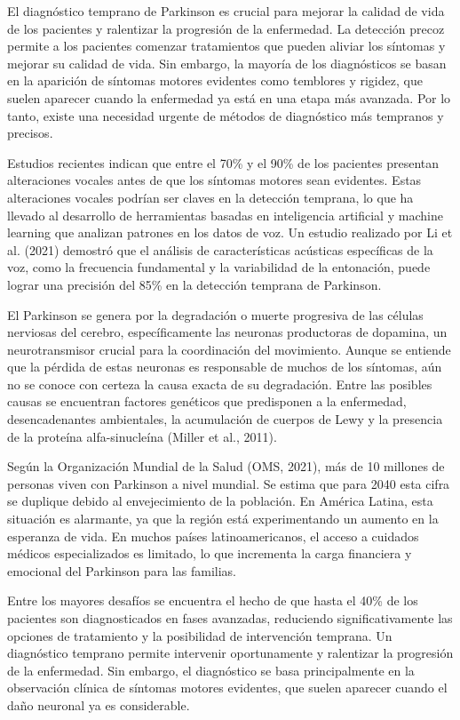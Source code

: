 \documentclass[a4paper,12pt]{article}
\begin{document}
El diagnóstico temprano de Parkinson es crucial para mejorar la calidad de vida de los pacientes y ralentizar la progresión de la enfermedad. La detección precoz permite a los pacientes comenzar tratamientos que pueden aliviar los síntomas y mejorar su calidad de vida. Sin embargo, la mayoría de los diagnósticos se basan en la aparición de síntomas motores evidentes como temblores y rigidez, que suelen aparecer cuando la enfermedad ya está en una etapa más avanzada. Por lo tanto, existe una necesidad urgente de métodos de diagnóstico más tempranos y precisos.

Estudios recientes indican que entre el 70\% y el 90\% de los pacientes presentan alteraciones vocales antes de que los síntomas motores sean evidentes. Estas alteraciones vocales podrían ser claves en la detección temprana, lo que ha llevado al desarrollo de herramientas basadas en inteligencia artificial y machine learning que analizan patrones en los datos de voz. Un estudio realizado por Li et al. (2021) demostró que el análisis de características acústicas específicas de la voz, como la frecuencia fundamental y la variabilidad de la entonación, puede lograr una precisión del 85\% en la detección temprana de Parkinson.

El Parkinson se genera por la degradación o muerte progresiva de las células nerviosas del cerebro, específicamente las neuronas productoras de dopamina, un neurotransmisor crucial para la coordinación del movimiento. Aunque se entiende que la pérdida de estas neuronas es responsable de muchos de los síntomas, aún no se conoce con certeza la causa exacta de su degradación. Entre las posibles causas se encuentran factores genéticos que predisponen a la enfermedad, desencadenantes ambientales, la acumulación de cuerpos de Lewy y la presencia de la proteína alfa-sinucleína (Miller et al., 2011).

Según la Organización Mundial de la Salud (OMS, 2021), más de 10 millones de personas viven con Parkinson a nivel mundial. Se estima que para 2040 esta cifra se duplique debido al envejecimiento de la población. En América Latina, esta situación es alarmante, ya que la región está experimentando un aumento en la esperanza de vida. En muchos países latinoamericanos, el acceso a cuidados médicos especializados es limitado, lo que incrementa la carga financiera y emocional del Parkinson para las familias.

Entre los mayores desafíos se encuentra el hecho de que hasta el 40\% de los pacientes son diagnosticados en fases avanzadas, reduciendo significativamente las opciones de tratamiento y la posibilidad de intervención temprana. Un diagnóstico temprano permite intervenir oportunamente y ralentizar la progresión de la enfermedad. Sin embargo, el diagnóstico se basa principalmente en la observación clínica de síntomas motores evidentes, que suelen aparecer cuando el daño neuronal ya es considerable.
\end{document}
